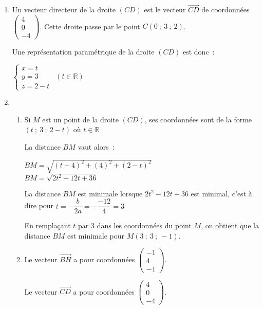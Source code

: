 \begin{corrige}
     \begin{enumerate}
          \item
          \par
          Un vecteur directeur de la droite $(CD)$ est le vecteur $\overrightarrow{CD}$ de coordonnées $\begin{pmatrix} 4\\0\\-4 \end{pmatrix}$. Cette droite passe par le point  $C(0~;~3~;~2)$.
          \par
          Une représentation paramétrique de la droite $(CD)$ est donc~:
          \begin{center}
               $\begin{cases}
                    x=t\\y=3\\z=2-t
               \end{cases}~~(t \in  \mathbb{R})$
          \end{center}
          \item
          \begin{enumerate}[label=\alph*.]
               \item
               Si $M$ est un point de la droite $(CD)$, ses coordonnées sont de la forme $(t~;~3~;~2-t)$ où $t \in \mathbb{R}$
               \par
               La distance $BM$ vaut alors~:
               \par
               $BM=\sqrt{\left(t-4 \right)^2+\left(4 \right)^2+\left(2-t \right)^2}$\\
               $BM=\sqrt{2t^2-12t+36} $
               \par
               La distance $BM$ est minimale lorsque $2t^2-12t+36$ est minimal, c'est à dire pour $t= -\dfrac{b}{2a}=-\dfrac{-12}{4}=3$
               \par
               En remplaçant $t$ par $3$ dans les coordonnées du point $M$, on obtient que la distance  $BM$ est minimale pour $M(3~;~3~;~-1)$.
               \item
               Le vecteur $\overrightarrow{BH}$ a pour coordonnées $ \begin{pmatrix}-1\\4\\-1\end{pmatrix}$.
               \par
               Le vecteur  $\overrightarrow{CD}$ a pour coordonnées $\begin{pmatrix}4\\0\\-4\end{pmatrix}$.

\end{enumerate}
\end{enumerate}
\end{corrige}
